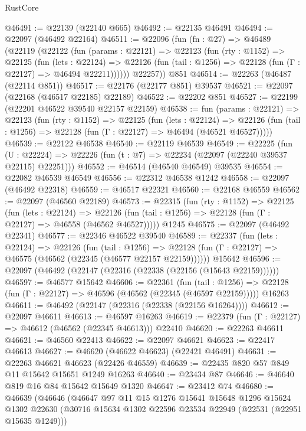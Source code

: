 \begin{lexlean}{RustCore}
\begin{coremodule}
@46491 := @22139 (@22140 @665)
@46492 := @22135 @46491
@46494 := @22097 (@46492 @22164)
@46511 := @22096
    (fun (fn : @27) =>
    @46489
      (@22119
        (@22122
          (fun (params : @22121) =>
          @22123
            (fun (rty : @1152) =>
            @22125
              (fun (lets : @22124) =>
              @22126 (fun (tail : @1256) => @22128 (fun (Γ : @22127) => @46494 @22211))))))
        @22257))
    @851
@46514 := @22263 (@46487 (@22114 @851))
@46517 := @22176 (@22177 @851) @39537
@46521 := @22097 (@22168 (@46517 @22185) @22189)
@46522 := @22202 @851
@46527 := @22199 (@22201 @46522 @39540 @22157 @22159)
@46538 := fun (params : @22121) =>
  @22123
    (fun (rty : @1152) =>
    @22125
      (fun (lets : @22124) =>
      @22126 (fun (tail : @1256) => @22128 (fun (Γ : @22127) => @46494 (@46521 @46527)))))
@46539 := @22122 @46538
@46540 := @22119 @46539
@46549 := @22225
    (fun (U : @22224) => @22226 (fun (t : @7) => @22234 (@22097 (@22240 @39537 @22115) @22251)))
@46552 := @46514 (@46540 @46549) @39535
@46554 := @22082 @46539 @46549
@46556 := @22312 @46538 @1242
@46558 := @22097 (@46492 @22318)
@46559 := @46517 @22321
@46560 := @22168 @46559
@46562 := @22097 (@46560 @22189)
@46573 := @22315
    (fun (rty : @1152) =>
    @22125
      (fun (lets : @22124) =>
      @22126 (fun (tail : @1256) => @22128 (fun (Γ : @22127) => @46558 (@46562 @46527)))))
    @1245
@46575 := @22097 (@46492 @22341)
@46577 := @22346 @46522 @39540
@46589 := @22337
    (fun (lets : @22124) =>
    @22126
      (fun (tail : @1256) =>
      @22128 (fun (Γ : @22127) => @46575 (@46562 (@22345 (@46577 @22157 @22159))))))
    @15642
@46596 := @22097 (@46492 (@22147 (@22316 (@22338 (@22156 (@15643 @22159))))))
@46597 := @46577 @15642
@46606 := @22361
    (fun (tail : @1256) => @22128 (fun (Γ : @22127) => @46596 (@46562 (@22345 (@46597 @22159)))))
    @16263
@46611 := @46492 (@22147 (@22316 (@22338 (@22156 @16264))))
@46612 := @22097 @46611
@46613 := @46597 @16263
@46619 := @22379 (fun (Γ : @22127) => @46612 (@46562 (@22345 @46613))) @22410
@46620 := @22263 @46611
@46621 := @46560 @22413
@46622 := @22097 @46621
@46623 := @22417 @46613
@46627 := @46620 (@46622 @46623) (@22421 @46491)
@46631 := @22263 @46621 @46623 (@22426 @46559)
@46639 := @22435 @820 @57 @849 @11 @15642 @15651 @1249 @16263
@46640 := @23434 @87
@46646 := @46640 @819 @16 @84 @15642 @15649 @1320
@46647 := @23412 @74
@46680 := @46639
    (@46646
      (@46647
        @97
        @11
        @15
        @1276
        @15641
        @15648
        @1296
        @15624
        @1302
        @22630
        (@30716 @15634 @1302 @22596 @23534 @22949 (@22531 (@22951 @15635 @1249)))

\end{coremodule}
\end{lexlean}
